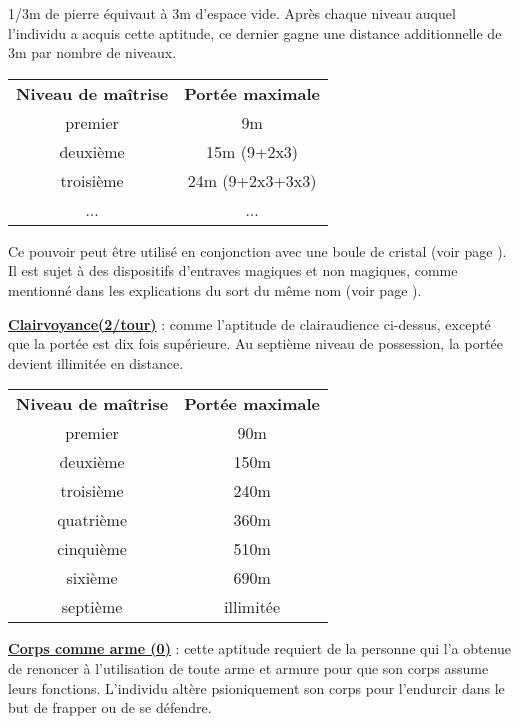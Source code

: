 \bigskip

1/3m de pierre équivaut à 3m d'espace vide. Après chaque niveau auquel l'individu a acquis cette aptitude, ce dernier gagne une distance additionnelle de 3m par nombre de niveaux.

\bigskip

\begin{tabular}{cc}
\textbf{Niveau de maîtrise} & \textbf{Portée maximale} \\
premier     & 9m \\
deuxième    & 15m (9+2x3) \\
troisième   & 24m (9+2x3+3x3) \\
...         & ... \\
\end{tabular}

\bigskip

Ce pouvoir peut être utilisé en conjonction avec une boule de cristal (voir page \pageref{objet-boule-cristal}). Il est sujet à des dispositifs d'entraves magiques et non magiques, comme mentionné dans les explications du sort du même nom (voir page \pageref{sort-clairaudience}).

\bigskip

\label{guerrier-clairvoyance}\textbf{\uline{Clairvoyance(2/tour)}} : comme l'aptitude de clairaudience ci-dessus, excepté que la portée est dix fois supérieure. Au septième niveau de possession, la portée devient illimitée en distance.

\bigskip
\begin{tabular}{cc}
\textbf{Niveau de maîtrise} & \textbf{Portée maximale} \\
premier     & 90m \\
deuxième    & 150m \\
troisième   & 240m \\
quatrième   & 360m \\
cinquième   & 510m \\
sixième     & 690m \\
septième    & illimitée \\
\end{tabular}

\bigskip

\label{guerrier-corps-comme-arme}\textbf{\uline{Corps comme arme (0)}} : cette aptitude requiert de la personne qui l'a obtenue de renoncer à l'utilisation de toute arme et armure pour que son corps assume leurs fonctions. L'individu altère psioniquement son corps pour l'endurcir dans le but de frapper ou de se défendre.

